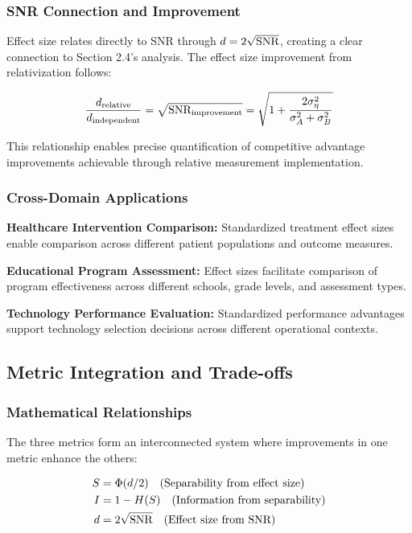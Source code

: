 \subsubsection{SNR Connection and Improvement}

Effect size relates directly to SNR through $d = 2\sqrt{\text{SNR}}$, creating a clear connection to Section 2.4's analysis. The effect size improvement from relativization follows:

\begin{equation}
\frac{d_{\text{relative}}}{d_{\text{independent}}} = \sqrt{\text{SNR}_{\text{improvement}}} = \sqrt{1 + \frac{2\sigma_\eta^2}{\sigma_A^2 + \sigma_B^2}}
\end{equation}

This relationship enables precise quantification of competitive advantage improvements achievable through relative measurement implementation.

\subsubsection{Cross-Domain Applications}

\textbf{Healthcare Intervention Comparison:} Standardized treatment effect sizes enable comparison across different patient populations and outcome measures.

\textbf{Educational Program Assessment:} Effect sizes facilitate comparison of program effectiveness across different schools, grade levels, and assessment types.

\textbf{Technology Performance Evaluation:} Standardized performance advantages support technology selection decisions across different operational contexts.

\subsection{Metric Integration and Trade-offs}

\subsubsection{Mathematical Relationships}

The three metrics form an interconnected system where improvements in one metric enhance the others:

\begin{align}
S &= \Phi(d/2) \quad \text{(Separability from effect size)}\\
I &= 1 - H(S) \quad \text{(Information from separability)}\\  
d &= 2\sqrt{\text{SNR}} \quad \text{(Effect size from SNR)}
\end{align}

